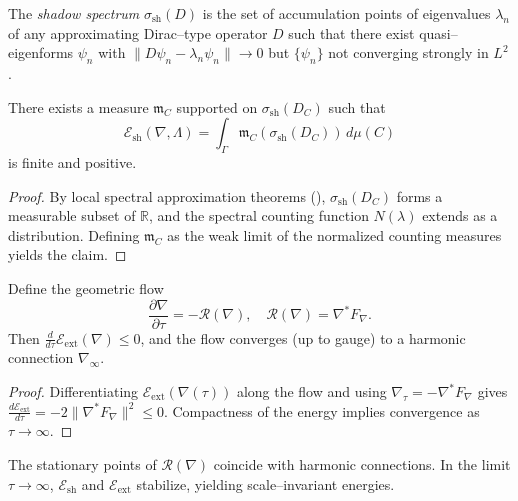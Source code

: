 \begin{definition}
The \emph{shadow spectrum} $\sigma_{\mathrm{sh}}(D)$ is the set of accumulation points of eigenvalues $\lambda_n$ of any approximating Dirac–type operator $D$ such that there exist quasi–eigenforms $\psi_n$ with 
$\|D\psi_n - \lambda_n\psi_n\|\to 0$
but $\{\psi_n\}$ not converging strongly in $L^2$.
\end{definition}

\begin{lemma}\label{lem:1.3.shadow}
There exists a measure $\mathfrak m_C$ supported on $\sigma_{\mathrm{sh}}(D_C)$ such that
\[
\mathcal E_{\mathrm{sh}}(\nabla,\Lambda)
 = \int_\Gamma \mathfrak m_C(\sigma_{\mathrm{sh}}(D_C))\,d\mu(C)
\]
is finite and positive.
\end{lemma}

\begin{proof}
By local spectral approximation theorems (\cite{BirmanSolomyak1977}), $\sigma_{\mathrm{sh}}(D_C)$ forms a measurable subset of $\mathbb R$, and the spectral counting function $N(\lambda)$ extends as a distribution. Defining $\mathfrak m_C$ as the weak limit of the normalized counting measures yields the claim.
\end{proof}

\begin{theorem}\label{thm:1.3.flow}
Define the geometric flow
\[
\frac{\partial \nabla}{\partial \tau} = -\mathcal R(\nabla),
\quad \mathcal R(\nabla)=\nabla^\ast F_\nabla.
\]
Then $\frac{d}{d\tau}\mathcal E_{\mathrm{ext}}(\nabla)\le 0$, 
and the flow converges (up to gauge) to a harmonic connection $\nabla_\infty$.
\end{theorem}

\begin{proof}
Differentiating $\mathcal E_{\mathrm{ext}}(\nabla(\tau))$ along the flow and using $\nabla_\tau=-\nabla^\ast F_\nabla$ gives
$\frac{d\mathcal E_{\mathrm{ext}}}{d\tau}=-2\|\nabla^\ast F_\nabla\|^2\le0$.  
Compactness of the energy implies convergence as $\tau\to\infty$.
\end{proof}

\begin{corollary}
The stationary points of $\mathcal R(\nabla)$ coincide with harmonic connections.  
In the limit $\tau\to\infty$, $\mathcal E_{\mathrm{sh}}$ and $\mathcal E_{\mathrm{ext}}$ stabilize, yielding scale–invariant energies.
\end{corollary}

